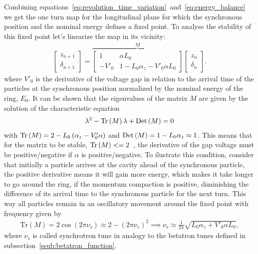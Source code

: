 	Combining equations~\eqref{eq:revolution_time_variation}~and~\eqref{eq:energy_balance} we get the one turn map for the longitudinal plane for which the synchronous position and the nominal energy defines a fixed point. To analyse the stability of this fixed point let's linearize the map in its vicinity:
	\begin{align}\label{eq:longitudinal_linear_map}
		\begin{bmatrix} z_{n+1} \\ \delta_{n+1}\end{bmatrix} = \overbrace{
			\begin{bmatrix}
                1 & \alpha L_0 \\
                -V'_0 & 1-L_0\alpha_z - V'_0\alpha L_0
            \end{bmatrix}
		}^M \begin{bmatrix} z_n \\ \delta_n \end{bmatrix}.
	\end{align}
	where $V'_0$ is the derivative of the voltage gap in relation to the arrival time of the particles at the synchronous position normalized by the nominal energy of the ring, $E_0$. It can be shown that the eigenvalues of the matrix $M$ are given by the solution of the characteristic equation
    \begin{align}
        \lambda^2 - \text{Tr}\left(M\right)\lambda + \text{Det}\left(M\right) = 0
    \end{align}
    with $\text{Tr}\left(M\right) = 2-L_0\left(\alpha_z-V'_0\alpha\right)$ and $\text{Det}\left(M\right) = 1-L_0\alpha_z\approx 1$. This means that for the matrix to be stable, $\text{Tr}\left(M\right) <= 2$~\cite{Courant1958}, the derivative of the gap voltage must be positive/negative if $\alpha$ is positive/negative. To ilustrate this condition, consider that initially a particle arrives at the cavity ahead of the synchronous particle, the positive derivative means it will gain more energy, which makes it take longer to go around the ring, if the momentum compaction is positive, diminishing the difference of its arrival time to the synchronous particle for the next turn. This way all particles remain in an oscillatory movement around the fixed point with frequency given by
	\begin{align}
		\text{Tr}(M) = 2\cos(2\pi\nu_s) \approx 2-(2\pi\nu_s)^2 \implies
		\nu_s \approx \frac{1}{2\pi}\sqrt{L_0\alpha_z+V'_0\alpha L_0},
	\end{align}
	where $\nu_s$ is called synchrotron tune in analogy to the betatron tunes defined in subsection~\ref{ssub:betatron_function}.

